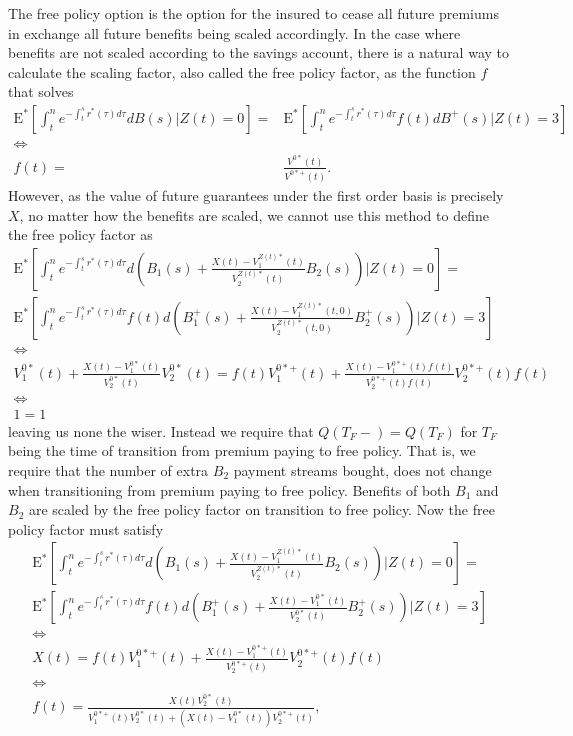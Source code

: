 \documentclass[12pt]{article}
\newcommand{\E}{\text{E}}
\theoremstyle{my_thm}
\begin{document}
The free policy option is the option for the insured to cease all future premiums in exchange all future benefits being scaled accordingly. In the case where benefits are not scaled according to the savings account, there is a natural way to calculate the scaling factor, also called the free policy factor, as the function $f$ that solves
\begin{align*}
\E^* \left[ \int_t^n e^{-\int_t^s r^*(\tau) d\tau} dB(s)|Z(t)=0 \right]
=&\E^* \left[ \int_t^n e^{-\int_t^s r^*(\tau) d\tau} f(t) dB^+(s)|Z(t)=3 \right]
\\
\Leftrightarrow&
\\
f(t)=&\frac{V^{0*}(t)}{V^{0*+}(t)}.
\end{align*}
However, as the value of future guarantees under the first order basis is precisely $X$, no matter how the benefits are scaled, we cannot use this method to define the free policy factor as
\begin{gather*}
\E^* \left[ \int_t^n e^{-\int_t^s r^*(\tau) d\tau} d \left( B_1(s)+\frac{X(t)-V_1^{Z(t)*}(t)}{V_2^{Z(t)*}(t)}B_2(s) \right) |Z(t)=0 \right]
=
\\
\E^* \left[ \int_t^n e^{-\int_t^s r^*(\tau) d\tau} f(t) d \left( B_1^+(s)+\frac{X(t)-V_1^{Z(t)*}(t,0)}{V_2^{Z(t)*}(t,0)}B_2^+(s) \right) |Z(t)=3 \right]
\\
\Leftrightarrow
\\
V_1^{0*}(t)+ \frac{X(t)-V_1^{0*}(t)}{V_2^{0*}(t)}V_2^{0*}(t)
=
f(t)V_1^{0*+}(t)+ \frac{X(t)-V_1^{0*+}(t)f(t)}{V_2^{0*+}(t)f(t)}V_2^{0*+}(t)f(t)
\\
 \Leftrightarrow
\\
1=1
\end{gather*}
leaving us none the wiser. Instead we require that $Q(T_F-)=Q(T_F)$ for $T_F$ being the time of transition from premium paying to free policy. That is, we require that the number of extra $B_2$ payment streams bought, does not change when transitioning from premium paying to free policy. Benefits of both $B_1$ and $B_2$ are scaled by the free policy factor on transition to free policy. Now the free policy factor must satisfy
\begin{gather*}
\E^* \left[ \int_t^n e^{-\int_t^s r^*(\tau) d\tau} d \left( B_1(s)+\frac{X(t)-V_1^{Z(t)*}(t)}{V_2^{Z(t)*}(t)}B_2(s) \right) |Z(t)=0 \right]
=
\\
\E^* \left[ \int_t^n e^{-\int_t^s r^*(\tau) d\tau} f(t) d \left( B_1^+(s)+\frac{X(t)-V_1^{0*}(t)}{V_2^{0*}(t)}B_2^+(s) \right) |Z(t)=3 \right]
\\
\Leftrightarrow
\\
X(t)
=
f(t)V_1^{0*+}(t)+ \frac{X(t)-V_1^{0*+}(t)}{V_2^{0*+}(t)}V_2^{0*+}(t)f(t)
\\
\Leftrightarrow
\\
f(t)=\frac{X(t)V_2^{0*}(t)}{V_1^{0*+}(t)V_2^{0*}(t)+(X(t)-V_1^{0*}(t))V_2^{0*+}(t)},
\end{gather*}
\end{document}
